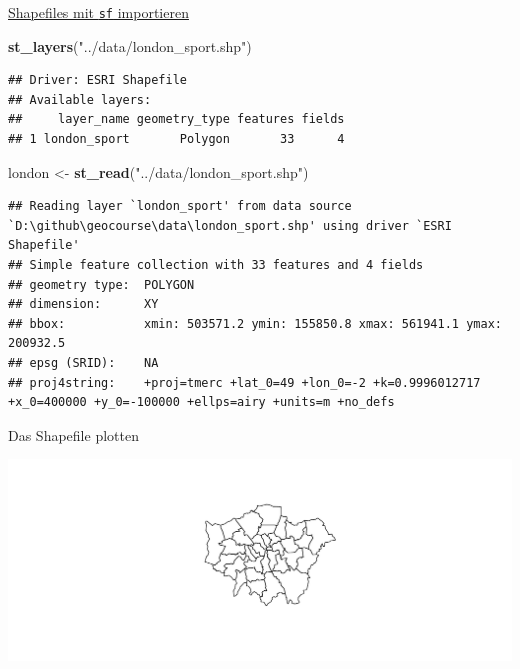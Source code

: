 \documentclass[ignorenonframetext,]{beamer}
\newenvironment{Shaded}{\begin{snugshade}}{\end{snugshade}}
\newcommand{\KeywordTok}[1]{\textcolor[rgb]{0.26,0.66,0.93}{\textbf{#1}}}
\newcommand{\NormalTok}[1]{\textcolor[rgb]{0.74,0.68,0.62}{#1}}
\newcommand{\OperatorTok}[1]{\textcolor[rgb]{0.74,0.68,0.62}{#1}}
\newcommand{\StringTok}[1]{\textcolor[rgb]{0.02,0.61,0.04}{#1}}
\begin{document}
\begin{frame}[fragile]{\href{https://cran.r-project.org/web/packages/sf/vignettes/sf2.html}{Shapefiles
mit \texttt{sf} importieren}}
\protect\hypertarget{shapefiles-mit-sf-importieren}{}

\begin{Shaded}
\begin{Highlighting}[]
\KeywordTok{st_layers}\NormalTok{(}\StringTok{"../data/london_sport.shp"}\NormalTok{)}
\end{Highlighting}
\end{Shaded}

\begin{verbatim}
## Driver: ESRI Shapefile 
## Available layers:
##     layer_name geometry_type features fields
## 1 london_sport       Polygon       33      4
\end{verbatim}

\begin{Shaded}
\begin{Highlighting}[]
\NormalTok{london <-}\StringTok{ }\KeywordTok{st_read}\NormalTok{(}\StringTok{"../data/london_sport.shp"}\NormalTok{)}
\end{Highlighting}
\end{Shaded}

\begin{verbatim}
## Reading layer `london_sport' from data source `D:\github\geocourse\data\london_sport.shp' using driver `ESRI Shapefile'
## Simple feature collection with 33 features and 4 fields
## geometry type:  POLYGON
## dimension:      XY
## bbox:           xmin: 503571.2 ymin: 155850.8 xmax: 561941.1 ymax: 200932.5
## epsg (SRID):    NA
## proj4string:    +proj=tmerc +lat_0=49 +lon_0=-2 +k=0.9996012717 +x_0=400000 +y_0=-100000 +ellps=airy +units=m +no_defs
\end{verbatim}

\end{frame}

\begin{frame}[fragile]{Das Shapefile plotten}
\protect\hypertarget{das-shapefile-plotten}{}

\begin{Shaded}
\end{Shaded}

\includegraphics{B7_simplefeatures_files/figure-beamer/unnamed-chunk-6-1.pdf}

\end{frame}
\end{document}
